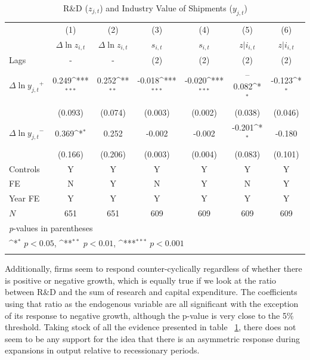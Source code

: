 \documentclass{_latex/house}
\begin{document}
\begin{table}[h]\footnotesize
\caption{R\&D ($z_{j,t}$) and Industry Value of Shipments ($y_{j,t}$)}
\begin{center}
{
\def\sym#1{\ifmmode^{#1}\else\(^{#1}\)\fi}
\begin{tabular}{l*{6}{c}}
\hline\hline
            &\multicolumn{1}{c}{(1)}&\multicolumn{1}{c}{(2)}&\multicolumn{1}{c}{(3)}&\multicolumn{1}{c}{(4)}&\multicolumn{1}{c}{(5)}&\multicolumn{1}{c}{(6)}\\
            &\multicolumn{1}{c}{$\Delta \ln{z_{i,t}}$}&\multicolumn{1}{c}{$\Delta \ln{z_{i,t}}$}&\multicolumn{1}{c}{$s_{i,t}$}&\multicolumn{1}{c}{$s_{i,t}$}&\multicolumn{1}{c}{$z|i_{i,t}$}&\multicolumn{1}{c}{$z|i_{i,t}$}\\
\hline
Lags & - & - & (2) & (2) & (2) & (2) \\
$\Delta\ln{y_{j,t}}^{+}$ & 0.249\sym{***} & 0.252\sym{**} & -0.018\sym{***} & -0.020\sym{***}& --0.082\sym{*} & -0.123\sym{*}  \\
 & (0.093) & (0.074) & (0.003) & (0.002) & (0.038) & (0.046) \\
$\Delta\ln{y_{j,t}}^{-}$ & 0.369\sym{*} &      0.252         &     -0.002 &     -0.002         &      -0.201\sym{*}  &   -0.180         \\
 &     (0.166)         &     (0.206)         &     (0.003)         &     (0.004)         &     (0.083)         &      (0.101)         \\
Controls & Y & Y & Y & Y & Y & Y \\
FE & N & Y & N & Y & N & Y \\
Year FE & Y & Y & Y & Y & Y & Y \\
\hline
\(N\) & 651 & 651 & 609 & 609 & 609 & 609 \\
\hline\hline
\multicolumn{7}{l}{\footnotesize \textit{p}-values in parentheses}\\
\multicolumn{7}{l}{\footnotesize \sym{*} \(p<0.05\), \sym{**} \(p<0.01\), \sym{***} \(p<0.001\)}\\
\label{tab:table6}
\end{tabular}
}
\end{center}
\end{table}Additionally, firms seem to respond counter-cyclically regardless of whether there is positive or negative growth, which is equally true if we look at the ratio between R\&D and the sum of research and capital expenditure. The coefficients using that ratio as the endogenous variable are all significant with the exception of its response to negative growth, although the p-value is very close to the 5\% threshold. Taking stock of all the evidence presented in table ~\ref{tab:table6}, there does not seem to be any support for the idea that there is an asymmetric response during expansions in output relative to recessionary periods.
\end{document}
